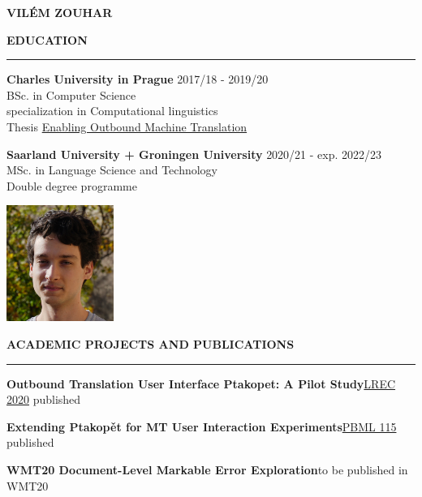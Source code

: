 \documentclass[11pt,a4paper]{article} %
\newcommand{\hSection}[1]{
    \medskip
    \MakeUppercase{\bf #1}
    \medskip
    \hrule
}
\newcommand{\hSubsectionI}[2]{{\bf #1}\hfill {#2}\hspace{-1cm}}
\begin{document}
\begin{center}
    {\LARGE \bf VILÉM ZOUHAR} \\
    {\large \href{mailto:vilem.zouhar@gmail.com}{\color{black}{vilem.zouhar@gmail.com}}}
\end{center}

\vspace{0.1cm}

\begin{minipage}{0.75\textwidth}
\hSection{Education}\vspace{0.2cm}
{\bf Charles University in Prague} \hfill {2017/18 - 2019/20} \\
BSc. in Computer Science \\
specialization in Computational linguistics \\
Thesis \href{https://dspace.cuni.cz/bitstream/handle/20.500.11956/119400/130284419.pdf?sequence=1&isAllowed=y}{Enabling Outbound Machine Translation}


{\bf Saarland University + Groningen University} \hfill {2020/21 - exp. 2022/23} \\
MSc. in Language Science and Technology \\
Double degree programme
\end{minipage}
% 
% 
\begin{minipage}{0.25\textwidth}
  \vspace{-2cm}
  \hfill
  \includegraphics[width=3.5cm]{portrait.jpg}
  \vspace{-0.9cm}
\end{minipage}

\hSection{Academic Projects and Publications}

\hSubsectionI{Outbound Translation User Interface Ptakopet: A Pilot Study}{\href{https://www.aclweb.org/anthology/2020.lrec-1.860.pdf}{LREC 2020} published}

\hSubsectionI{Extending Ptakopět for MT User Interaction Experiments}{\href{https://ufal.mff.cuni.cz/pbml/115/art-zouhar-novak.pdf}{PBML 115} published}

\hSubsectionI{WMT20 Document-Level Markable Error Exploration}{to be published in WMT20}
\end{document}
